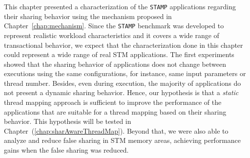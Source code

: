 This chapter presented a characterization of the \texttt{STAMP} applications regarding their sharing behavior using the mechanism proposed in Chapter~\ref{chap:mechanism}. %
Since the \texttt{STAMP} benchmark was developed to represent realistic workload characteristics and it covers a wide range of transactional behavior, we expect that the characterization done in this chapter could represent a wide range of real STM applications. The first experiments showed that the sharing behavior of applications does not change between executions using the same configurations, for instance, same input parameters or thread number. Besides, even during execution, the majority of applications do not present a dynamic sharing behavior.
Hence, our hypothesis is that a \emph{static} thread mapping approach is sufficient to improve the performance of the applications that are suitable for a thread mapping based on their sharing behavior. This hypothesis will be tested in Chapter~(\ref{chap:sharAwareThreadMap}). Beyond that, we were also able to analyze and reduce false sharing in STM memory areas, achieving performance gains when the false sharing was reduced.


